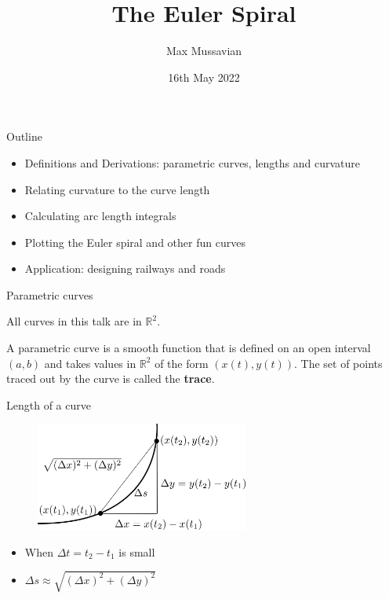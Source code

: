 \documentclass{beamer}
\title{The Euler Spiral}
\author{Max Mussavian}
\date[2022]{16th May 2022}
\begin{document}
\begin{frame}[plain]
    \maketitle
\end{frame}
\begin{frame}{Outline}
	\begin{itemize}
		\item Definitions and Derivations: parametric curves, lengths and curvature
		\item Relating curvature to the curve length
		\item Calculating arc length integrals
		\item Plotting the Euler spiral and other fun curves
		\item Application: designing railways and roads
	\end{itemize}
\end{frame}


\begin{frame}{Parametric curves}
	
		All curves in this talk are in $\mathbb{R}^2$.
		\begin{definition}
			A parametric curve is a smooth function that is defined on an open interval $(a, b)$ and takes values in $\mathbb{R}^2$ of the form $(x(t), y(t))$.
			\newline
			The set of points traced out by the curve is called the \textbf{trace}.
		\end{definition}
\end{frame}

\begin{frame}{Length of a curve}
	\begin{figure}
	\centering
	\includegraphics[width=70mm, scale=0.4]{curve_length_2.png}
	\end{figure}
	\begin{itemize}
	\item When $\Delta t = t_2 - t_1$ is small
	\item $\Delta s \approx	\sqrt{\left(\Delta x\right)^2 + \left(\Delta y\right)^2} $
	\end{itemize}
\end{frame}
\end{document}
